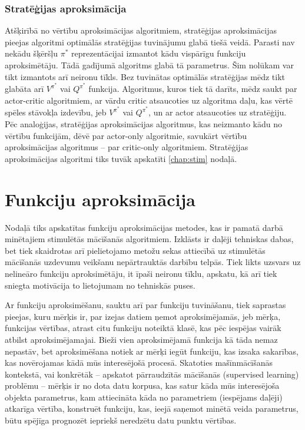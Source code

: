 \documentclass{ludis} %
\begin{document}
\subsection{Stratēģijas aproksimācija}
Atšķirībā no vērtību aproksimācijas algoritmiem, stratēģijas aproksimācijas pieejas algoritmi optimālās stratēģijas tuvinājumu glabā tiešā veidā.
Parasti nav nekādu šķēršļu $\pi^*$ reprezentācijai izmantot kādu vispārīgu funkciju aproksimētāju. Tādā gadījumā algoritms glabā tā parametrus.
Šim nolūkam var tikt izmantots arī neironu tīkls.
Bez tuvinātas optimālās stratēģijas mēdz tikt glabāta arī $V^{\pi^*}$ vai $Q^{\pi^*}$ funkcija.
Algoritmus, kuros tiek tā darīts, mēdz saukt par actor-critic algoritmiem, ar vārdu critic atsaucoties uz algoritma daļu, kas vērtē spēles stāvokļa izdevību, jeb $V^{\pi^*}$ vai $Q^{\pi^*}$, un ar actor atsaucoties uz stratēģiju.
Pēc analoģijas, stratēģijas aproksimācijas algoritmus, kas neizmanto kādu no vērtību funkcijām, dēvē par actor-only algoritmie, savukārt vērtību aproksimācijas algoritmus -- par critic-only algoritmiem.
Stratēģijas aproksimācijas algoritmi tiks tuvāk apskatīti \ref{chap:stim} nodaļā.

\chapter{Funkciju aproksimācija}
Nodaļā tiks apskatītas funkciju aproksimācijas metodes, kas ir pamatā darbā minētajiem stimulētās mācīšanās algoritmiem.
Izklāsts ir daļēji tehniskas dabas, bet tiek skaidrotas arī pielietojamo metožu sekas attiecībā uz stimulētās mācīšanās uzdevumu veikšanu nepārtrauktās darbību telpās.
Tiek likts uzsvars uz nelineāro funkciju aproksimētāju, it īpaši neironu tīklu, apskatu, kā arī tiek sniegta motivācija to lietojumam no tehniskās puses.

Ar funkciju aproksimēšanu, sauktu arī par funkciju tuvināšanu, tiek saprastas pieejas, kuru mērķis ir, par izejas datiem ņemot aproksimējamās, jeb mērķa, funkcijas vērtības, atrast citu funkciju noteiktā klasē, kas pēc iespējas vairāk atbilst aproksimējamajai.
Bieži vien aproksimējamā funkcija kā tāda nemaz nepastāv, bet aproksimēšana notiek ar mērķi iegūt funkciju, kas izsaka sakarības, kas novērojamas kādā mūs interesējošā procesā.
Skatoties mašīnmācīšanās kontekstā, vai konkrētāk -- apskatot pārraudzītās mācīšanās (supervised learning) problēmu -- mērķis ir no dota datu korpusa, kas satur kāda mūs interesējoša objekta parametrus, kam attiecināta kāda no parametriem (iespējams daļēji) atkarīga vērtība, konstruēt funkciju, kas, ieejā saņemot minētā veida parametrus, būtu spējīga prognozēt iepriekš neredzētu datu punktu vērtības.
\end{document}
